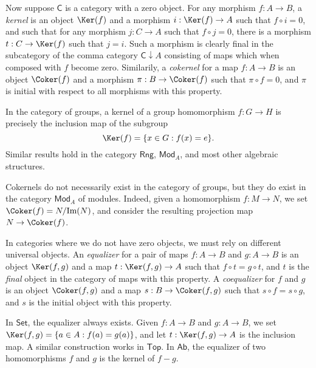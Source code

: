 Now suppose $\mathsf{C}$ is a category with a zero object. For any morphism $f: A \to B$, a \emph{kernel} is an object $\Ker(f)$ and a morphism $i: \Ker(f) \to A$ such that $f \circ i = 0$, and such that for any morphism $j: C \to A$ such that $f \circ j = 0$, there is a morphism $t: C \to \Ker(f)$ such that $j = i$. Such a morphism is clearly final in the subcategory of the comma category $\mathsf{C} \downarrow A$ consisting of maps which when composed with $f$ become zero. Similarily, a \emph{cokernel} for a map $f: A \to B$ is an object $\Coker(f)$ and a morphism $\pi: B \to \Coker(f)$ such that $\pi \circ f = 0$, and $\pi$ is initial with respect to all morphisms with this property.

\begin{example}
    In the category of groups, a kernel of a group homomorphism $f: G \to H$ is precisely the inclusion map of the subgroup
    \[ \Ker(f) = \{ x \in G: f(x) = e \}. \]
    Similar results hold in the category $\mathsf{Rng}$, $\mathsf{Mod}_A$, and most other algebraic structures.
\end{example}

\begin{example}
    Cokernels do not necessarily exist in the category of groups, but they do exist in the category $\mathsf{Mod}_A$ of modules. Indeed, given a homomorphism $f: M \to N$, we set $\Coker(f) = N/\text{Im}(N)$, and consider the resulting projection map $N \to \Coker(f)$.
\end{example}

In categories where we do not have zero objects, we must rely on different universal objects. An \emph{equalizer} for a pair of maps $f: A \to B$ and $g: A \to B$ is an object $\Ker(f,g)$ and a map $t: \Ker(f,g) \to A$ such that $f \circ t = g \circ t$, and $t$ is the \emph{final} object in the category of maps with this property. A \emph{coequalizer} for $f$ and $g$ is an object $\Coker(f,g)$ and a map $s: B \to \Coker(f,g)$ such that $s \circ f = s \circ g$, and $s$ is the initial object with this property.

\begin{example}
    In $\mathsf{Set}$, the equalizer always exists. Given $f: A \to B$ and $g: A \to B$, we set $\Ker(f,g) = \{ a \in A: f(a) = g(a) \}$, and let $t: \Ker(f,g) \to A$ is the inclusion map. A similar construction works in $\mathsf{Top}$. In $\mathsf{Ab}$, the equalizer of two homomorphisms $f$ and $g$ is the kernel of $f - g$.
\end{example}

